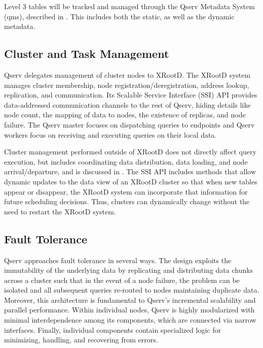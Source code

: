 \documentclass[DM,toc]{lsstdoc}
\begin{document}
Level 3 tables will be tracked and managed through the Qserv Metadata System
(qms), described in . This includes both the static, as well
as the dynamic metadata.

\subsection{Cluster and Task Management}\label{cluster-and-task-management}

Qserv delegates management of cluster nodes to XRootD. The XRootD system
manages cluster membership, node registration/deregistration, address lookup,
replication, and communication. Its Scalable Service Interface (SSI) API
provides data-addressed communication channels to the rest of Qserv, hiding
details like node count, the mapping of data to nodes, the existence of
replicas, and node failure. The Qserv master focuses on dispatching queries to
endpoints and Qserv workers focus on receiving and executing queries on their
local data.

Cluster management performed outside of XRootD does not directly affect query
execution, but includes coordinating data distribution, data loading, and node
arrival/departure, and is discussed in . The SSI API
includes methods that allow dynamic updates to the data view of an XRootD
cluster so that when new tables appear or disappear, the XRootD system can
incorporate that information for future scheduling decisions. Thus, clusters
can dynamically change without the need to restart the XRootD system.

\subsection{Fault Tolerance}\label{fault-tolerance}

Qserv approaches fault tolerance in several ways. The design exploits the
immutability of the underlying data by replicating and distributing data
chunks across a cluster such that in the event of a node failure, the problem
can be isolated and all subsequent queries re-routed to nodes maintaining
duplicate data. Moreover, this architecture is fundamental to Qserv's
incremental scalability and parallel performance. Within individual nodes,
Qserv is highly modularized with minimal interdependence among its components,
which are connected via narrow interfaces. Finally, individual components
contain specialized logic for minimizing, handling, and recovering from
errors.
\end{document}
